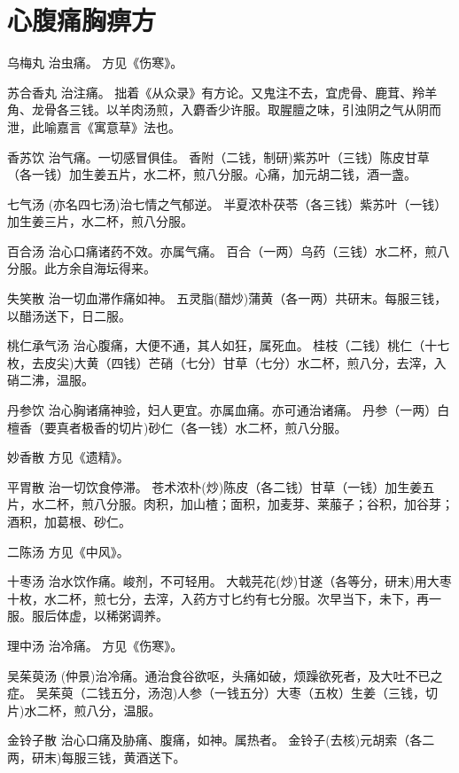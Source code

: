 \documentclass[a4paper,12pt,UTF8,twoside]{ctexbook}
\begin{document}
    \chapter{心腹痛胸痹方}
     乌梅丸
    治虫痛。
    方见《伤寒》。
    
    苏合香丸
    治注痛。
    拙着《从众录》有方论。又鬼注不去，宜虎骨、鹿茸、羚羊角、龙骨各三钱。以羊肉汤煎，入麝香少许服。取腥膻之味，引浊阴之气从阴而泄，此喻嘉言《寓意草》法也。
    
    香苏饮
    治气痛。一切感冒俱佳。
    香附（二钱，制研)紫苏叶（三钱）陈皮甘草（各一钱）加生姜五片，水二杯，煎八分服。心痛，加元胡二钱，酒一盏。
    
    七气汤
    (亦名四七汤)治七情之气郁逆。
    半夏浓朴茯苓（各三钱）紫苏叶（一钱）加生姜三片，水二杯，煎八分服。
    
    百合汤
    治心口痛诸药不效。亦属气痛。
    百合（一两）乌药（三钱）水二杯，煎八分服。此方余自海坛得来。
    
    失笑散
    治一切血滞作痛如神。
    五灵脂(醋炒)蒲黄（各一两）共研末。每服三钱，以醋汤送下，日二服。
    
    桃仁承气汤
    治心腹痛，大便不通，其人如狂，属死血。
    桂枝（二钱）桃仁（十七枚，去皮尖)大黄（四钱）芒硝（七分）甘草（七分）水二杯，煎八分，去滓，入硝二沸，温服。
    
    丹参饮
    治心胸诸痛神验，妇人更宜。亦属血痛。亦可通治诸痛。
    丹参（一两）白檀香（要真者极香的切片)砂仁（各一钱）水二杯，煎八分服。
    
    妙香散
    方见《遗精》。
    
    平胃散
    治一切饮食停滞。
    苍术浓朴(炒)陈皮（各二钱）甘草（一钱）加生姜五片，水二杯，煎八分服。肉积，加山楂；面积，加麦芽、莱菔子；谷积，加谷芽；酒积，加葛根、砂仁。
    
    二陈汤
    方见《中风》。
    
    十枣汤
    治水饮作痛。峻剂，不可轻用。
    大戟芫花(炒)甘遂（各等分，研末)用大枣十枚，水二杯，煎七分，去滓，入药方寸匕约有七分服。次早当下，未下，再一服。服后体虚，以稀粥调养。
    
    理中汤
    治冷痛。
    方见《伤寒》。
    
    吴茱萸汤
    (仲景)治冷痛。通治食谷欲呕，头痛如破，烦躁欲死者，及大吐不已之症。
    吴茱萸（二钱五分，汤泡)人参（一钱五分）大枣（五枚）生姜（三钱，切片)水二杯，煎八分，温服。
    
    金铃子散
    治心口痛及胁痛、腹痛，如神。属热者。
    金铃子(去核)元胡索（各二两，研末)每服三钱，黄酒送下。
    
\end{document}

